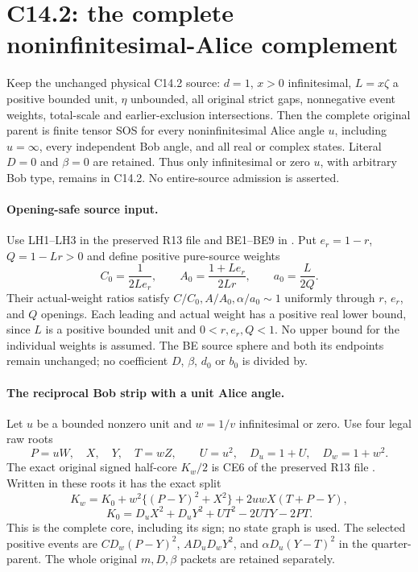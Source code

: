 \section{C14.2: the complete noninfinitesimal-Alice complement}
\label{sec:r18-c142-remote}

\begin{proposition}
Keep the unchanged physical C14.2 source: $d=1$, $x>0$
infinitesimal, $L=x\zeta$ a positive bounded unit, $\eta$ unbounded,
all original strict gaps, nonnegative event weights, total-scale and
earlier-exclusion intersections.  Then the complete original parent
is finite tensor SOS for every noninfinitesimal Alice angle $u$,
including $u=\infty$, every independent Bob angle, and all real or
complex states.  Literal $D=0$ and $\beta=0$ are retained.  Thus
only infinitesimal or zero $u$, with arbitrary Bob type, remains in
C14.2.  No entire-source admission is asserted.
\end{proposition}

\paragraph{Opening-safe source input.}
Use LH1--LH3 in the preserved R13 file
 and BE1--BE9
in .
Put $e_r=1-r$, $Q=1-Lr>0$ and define positive pure-source weights
\[
 C_0=\frac1{2Le_r},\qquad
 A_0=\frac{1+Le_r}{2Lr},\qquad
 a_0=\frac L{2Q}.
                                                               \tag{LA1}
\]
Their actual-weight ratios satisfy
$C/C_0,A/A_0,\alpha/a_0\sim1$ uniformly through $r$, $e_r$,
and $Q$ openings.  Each leading and actual weight has a positive
real lower bound, since $L$ is a positive bounded unit and
$0<r,e_r,Q<1$.  No upper bound for the individual weights is assumed.
The BE source sphere and both its endpoints remain unchanged; no
coefficient $D$, $\beta$, $d_0$ or $b_0$ is divided by.

\paragraph{The reciprocal Bob strip with a unit Alice angle.}
Let $u$ be a bounded nonzero unit and $w=1/v$ infinitesimal or zero.
Use four legal raw roots
\[
 P=uW,\quad X,\quad Y,\quad T=wZ,
 \qquad U=u^2,\quad D_u=1+U,\quad D_w=1+w^2.
\]
The exact original signed half-core $K_w/2$ is CE6 of the preserved
R13 file .
Written in these roots it has the exact split
\[
 K_w=K_0+w^2\{(P-Y)^2+X^2\}
                      +2uwX(T+P-Y),                         \tag{LA2}
\]
\[
 K_0=D_uX^2+D_uY^2+UT^2-2UTY-2PT.
\]
This is the complete core, including its sign; no state graph is used.
The selected positive events are
$CD_w(P-Y)^2$, $AD_uD_wY^2$, and
$\alpha D_u(Y-T)^2$ in the quarter-parent.  The whole original
$m,D,\beta$ packets are retained separately.

